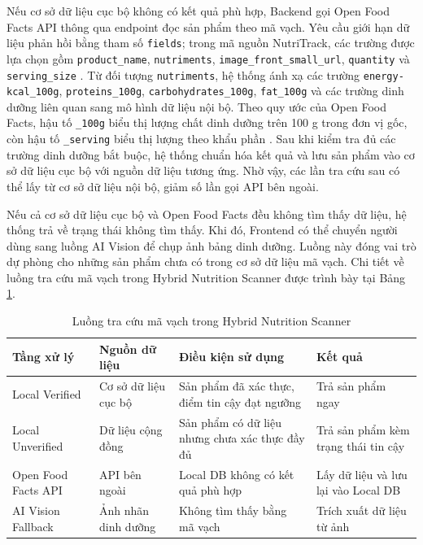 \documentclass[12pt, a4paper]{report}
\begin{document}
Nếu cơ sở dữ liệu cục bộ không có kết quả phù hợp, Backend gọi Open Food Facts API thông qua endpoint đọc sản phẩm theo mã vạch. Yêu cầu giới hạn dữ liệu phản hồi bằng tham số \texttt{fields}; trong mã nguồn NutriTrack, các trường được lựa chọn gồm \texttt{product\_\allowbreak name}, \texttt{nutriments}, \texttt{image\_\allowbreak front\_\allowbreak small\_\allowbreak url}, \texttt{quantity} và \texttt{serving\_\allowbreak size} \cite{offApiCheatSheet}. Từ đối tượng \texttt{nutriments}, hệ thống ánh xạ các trường \texttt{energy-kcal\_\allowbreak 100g}, \texttt{proteins\_\allowbreak 100g}, \texttt{carbohydrates\_\allowbreak 100g}, \texttt{fat\_\allowbreak 100g} và các trường dinh dưỡng liên quan sang mô hình dữ liệu nội bộ. Theo quy ước của Open Food Facts, hậu tố \texttt{\_100g} biểu thị lượng chất dinh dưỡng trên 100 g trong đơn vị gốc, còn hậu tố \texttt{\_serving} biểu thị lượng theo khẩu phần \cite{offNutritionData}. Sau khi kiểm tra đủ các trường dinh dưỡng bắt buộc, hệ thống chuẩn hóa kết quả và lưu sản phẩm vào cơ sở dữ liệu cục bộ với nguồn dữ liệu tương ứng. Nhờ vậy, các lần tra cứu sau có thể lấy từ cơ sở dữ liệu nội bộ, giảm số lần gọi API bên ngoài.

Nếu cả cơ sở dữ liệu cục bộ và Open Food Facts đều không tìm thấy dữ liệu, hệ thống trả về trạng thái không tìm thấy. Khi đó, Frontend có thể chuyển người dùng sang luồng AI Vision để chụp ảnh bảng dinh dưỡng. Luồng này đóng vai trò dự phòng cho những sản phẩm chưa có trong cơ sở dữ liệu mã vạch. Chi tiết về luồng tra cứu mã vạch trong Hybrid Nutrition Scanner được trình bày tại Bảng \ref{tab:luong_tra_cuu_barcode}.

\begin{table}[htbp]
\centering
\caption{Luồng tra cứu mã vạch trong Hybrid Nutrition Scanner}
\label{tab:luong_tra_cuu_barcode}
\begin{tabular}{|>{\raggedright\arraybackslash}p{3cm}|>{\raggedright\arraybackslash}p{3cm}|>{\raggedright\arraybackslash}p{4cm}|>{\raggedright\arraybackslash}p{5cm}|}
\hline
\textbf{Tầng xử lý} & \textbf{Nguồn dữ liệu} & \textbf{Điều kiện sử dụng} & \textbf{Kết quả} \\
\hline
Local Verified & Cơ sở dữ liệu cục bộ & Sản phẩm đã xác thực, điểm tin cậy đạt ngưỡng & Trả sản phẩm ngay \\
\hline
Local Unverified & Dữ liệu cộng đồng & Sản phẩm có dữ liệu nhưng chưa xác thực đầy đủ & Trả sản phẩm kèm trạng thái tin cậy \\
\hline
Open Food Facts API & API bên ngoài & Local DB không có kết quả phù hợp & Lấy dữ liệu và lưu lại vào Local DB \\
\hline
AI Vision Fallback & Ảnh nhãn dinh dưỡng & Không tìm thấy bằng mã vạch & Trích xuất dữ liệu từ ảnh \\
\hline
\end{tabular}
\end{table}
\end{document}
